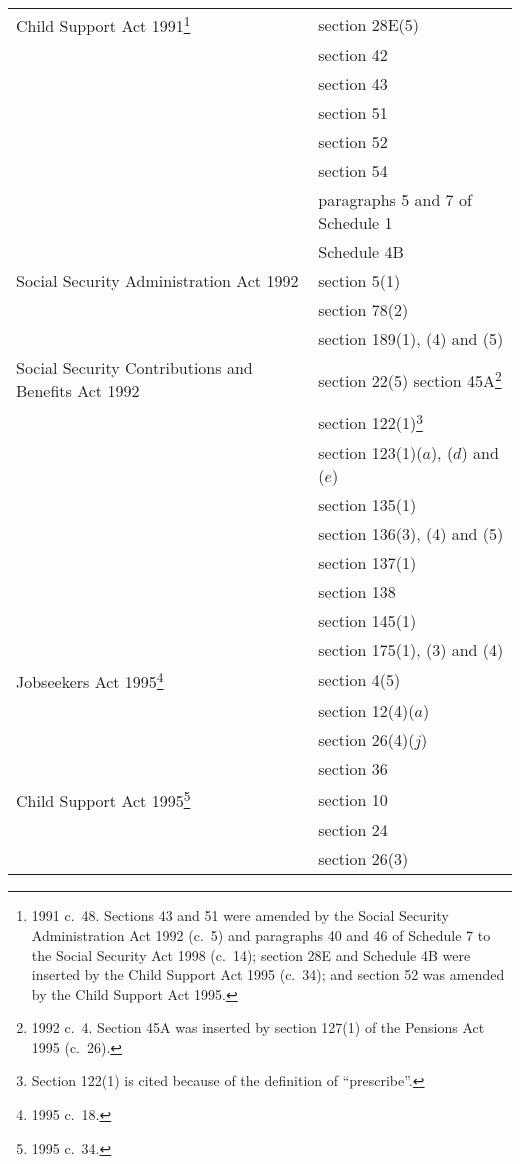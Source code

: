 \documentclass[12pt,a4paper]{article}
\begin{document}
\begin{longtable}{p{221.45412pt}p{144.56973pt}}
\hline
\endhead
\hline
\endlastfoot
Child Support Act 1991\footnote{1991 c.\ 48. Sections 43 and 51 were amended by the Social Security Administration Act 1992 (c.\ 5) and paragraphs 40 and 46 of Schedule 7 to the Social Security Act 1998 (c.\ 14); section 28E and Schedule 4B were inserted by the Child Support Act 1995 (c.\ 34); and section 52 was amended by the Child Support Act 1995.}	&section 28E(5)\\
	&section 42\\
	&section 43\\
	&section 51\\
	&section 52\\
	&section 54\\
	&paragraphs 5 and 7 of Schedule 1\\
	&Schedule 4B\\
Social Security Administration Act 1992	&section 5(1)\\
	&section 78(2)\\
	&section 189(1), (4) and (5)\\
Social Security Contributions and Benefits Act 1992	&section 22(5)\newline
	section 45A\footnote{1992 c.\ 4. Section 45A was inserted by section 127(1) of the Pensions Act 1995 (c.\ 26).}\\
	&section 122(1)\footnote{Section 122(1) is cited because of the definition of “prescribe”.}\\
\pagebreak[4]
	&section 123(1)($a$), ($d$)  and ($e$) \\
	&section 135(1)\\
	&section 136(3), (4) and (5)\\
	&section 137(1)\\
	&section 138\\
	&section 145(1)\\
	&section 175(1), (3) and (4)\\
Jobseekers Act 1995\footnote{1995 c.\ 18.}	&section 4(5)\\
	&section 12(4)($a$) \\
	&section 26(4)($j$) \\
	&section 36\\
Child Support Act 1995\footnote{1995 c.\ 34.}	&section 10\\
	&section 24\\
	&section 26(3)\\
\end{longtable}
\end{document}
